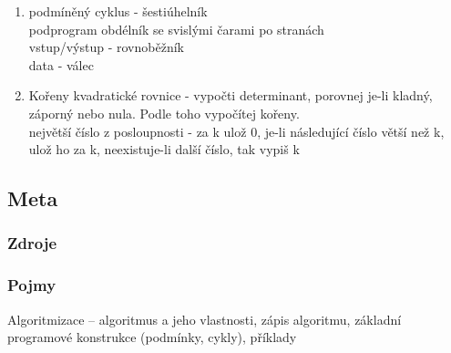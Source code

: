 \documentclass[12pt]{article}
\begin{document}
\begin{enumerate}
\item podmíněný cyklus - šestiúhelník\\
podprogram obdélník se svislými čarami po stranách\\
vstup/výstup - rovnoběžník\\
data - válec
\item Kořeny kvadratické rovnice - vypočti determinant, porovnej je-li kladný, záporný nebo nula. Podle toho vypočítej kořeny.\\
největší číslo z posloupnosti - za k ulož 0, je-li následující číslo větší než k, ulož ho za k, neexistuje-li další číslo, tak vypiš k
\end{enumerate}
\subsection{Meta}
\subsubsection{Zdroje}
\subsubsection{Pojmy}
Algoritmizace – algoritmus a jeho vlastnosti, zápis algoritmu, základní programové konstrukce (podmínky, cykly), příklady
\end{document}
